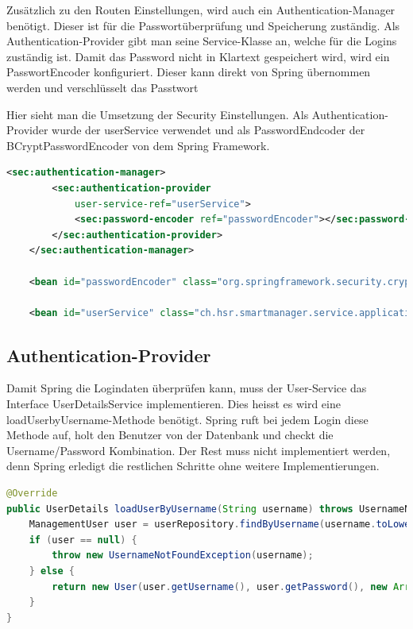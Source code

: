 Zusätzlich zu den Routen Einstellungen, wird auch ein Authentication-Manager benötigt. Dieser ist für die Passwortüberprüfung und Speicherung zuständig. Als Authentication-Provider gibt man seine Service-Klasse an, welche für die Logins zuständig ist. Damit das Password nicht in Klartext gespeichert wird, wird ein PasswortEncoder konfiguriert. Dieser kann direkt von Spring übernommen werden und verschlüsselt das Passtwort
\newpage

Hier sieht man die Umsetzung der Security Einstellungen. Als Authentication-Provider wurde der userService verwendet und als PasswordEndcoder der BCryptPasswordEncoder von dem Spring Framework.
\begin{lstlisting}[language=xml]
<sec:authentication-manager>
		<sec:authentication-provider
			user-service-ref="userService">
			<sec:password-encoder ref="passwordEncoder"></sec:password-encoder>
		</sec:authentication-provider>
	</sec:authentication-manager>
	
	<bean id="passwordEncoder" class="org.springframework.security.crypto.bcrypt.BCryptPasswordEncoder"></bean>
	
	<bean id="userService" class="ch.hsr.smartmanager.service.applicationservices.UserService"></bean>
\end{lstlisting}

\subsection{Authentication-Provider}
Damit Spring die Logindaten überprüfen kann, muss der User-Service das Interface UserDetailsService implementieren. Dies heisst es wird eine loadUserbyUsername-Methode benötigt. Spring ruft bei jedem Login diese Methode auf, holt den Benutzer von der Datenbank und checkt die Username/Password Kombination. Der Rest muss nicht implementiert werden, denn Spring erledigt die restlichen Schritte ohne weitere Implementierungen.
\begin{lstlisting}[language=java]
@Override
public UserDetails loadUserByUsername(String username) throws UsernameNotFoundException {
	ManagementUser user = userRepository.findByUsername(username.toLowerCase());
	if (user == null) {
		throw new UsernameNotFoundException(username);
	} else {
		return new User(user.getUsername(), user.getPassword(), new ArrayList<>());
	}
}
\end{lstlisting}
\newpage

	
